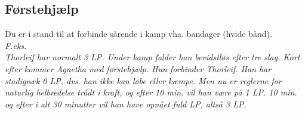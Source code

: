 \subsection*{Førstehjælp}
Du er i stand til at forbinde sårende i kamp vha. bandager (hvide bånd).\\
\textit{F.eks.\\
Thorleif har normalt 3 LP. Under kamp falder han bevidstløs efter tre slag. Kort efter kommer Agnetha med førstehjælp. Hun forbinder Thorleif. Han har stadigvæk 0 LP, dvs. han ikke kan løbe eller kæmpe. Men nu er reglerne for naturlig helbredelse trådt i kraft, og efter 10 min. vil han være på 1 LP. 10 min. og efter i alt 30 minutter vil han have opnået fuld LP, altså 3 LP.}